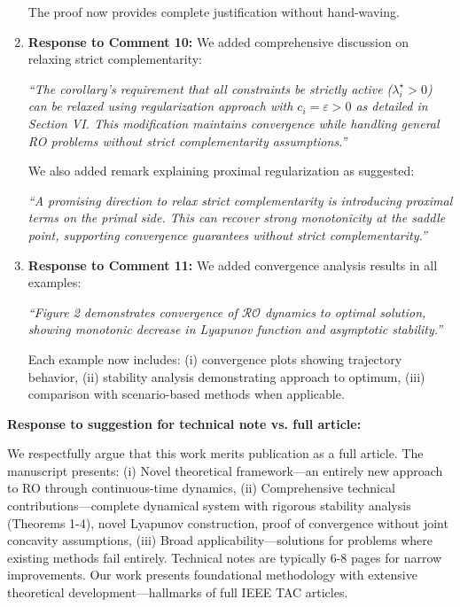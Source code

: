 \documentclass[journal,twoside,web]{ieeecolor}
\begin{document}
\begin{enumerate}
The proof now provides complete justification without hand-waving.

\item \textbf{Response to Comment 10:} We added comprehensive discussion on relaxing strict complementarity:

{\color{revisionblue}\textit{``The corollary's requirement that all constraints be strictly active ($\lambda_i^\star > 0$) can be relaxed using regularization approach with $c_i = \varepsilon > 0$ as detailed in Section VI. This modification maintains convergence while handling general RO problems without strict complementarity assumptions.''}}

We also added remark explaining proximal regularization as suggested:

{\color{revisionblue}\textit{``A promising direction to relax strict complementarity is introducing proximal terms on the primal side. This can recover strong monotonicity at the saddle point, supporting convergence guarantees without strict complementarity.''}}

\item \textbf{Response to Comment 11:} We added convergence analysis results in all examples:

{\color{revisionblue}\textit{``Figure 2 demonstrates convergence of $\mathcal{RO}$ dynamics to optimal solution, showing monotonic decrease in Lyapunov function and asymptotic stability.''}}

Each example now includes: (i) convergence plots showing trajectory behavior, (ii) stability analysis demonstrating approach to optimum, (iii) comparison with scenario-based methods when applicable.
\end{enumerate}

\noindent\textbf{Response to suggestion for technical note vs. full article:}

We respectfully argue that this work merits publication as a full article. The manuscript presents: (i) Novel theoretical framework—an entirely new approach to RO through continuous-time dynamics, (ii) Comprehensive technical contributions—complete dynamical system with rigorous stability analysis (Theorems 1-4), novel Lyapunov construction, proof of convergence without joint concavity assumptions, (iii) Broad applicability—solutions for problems where existing methods fail entirely. Technical notes are typically 6-8 pages for narrow improvements. Our work presents foundational methodology with extensive theoretical development—hallmarks of full IEEE TAC articles.
\end{document}
